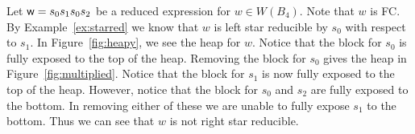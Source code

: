 \begin{example}\label{ex:starredheap}
Let $\mathsf{w}=s_0s_1s_0s_2$ be a reduced expression for $w \in W(B_4)$. Note that $w$ is FC. By Example~\ref{ex:starred} we know that $w$ is left star reducible by $s_0$ with respect to $s_1$. In Figure~\ref{fig:heapy}, we see the heap for $w$. Notice that the block for $s_0$ is fully exposed to the top of the heap. Removing the block for $s_0$ gives the heap in Figure~\ref{fig:multiplied}. Notice that the block for $s_1$ is now fully exposed to the top of the heap. However, notice that the block for $s_0$ and $s_2$ are fully exposed to the bottom. In removing either of these we are unable to fully expose $s_1$ to the bottom. Thus we can see that $w$ is not right star reducible.  
\end{example}



